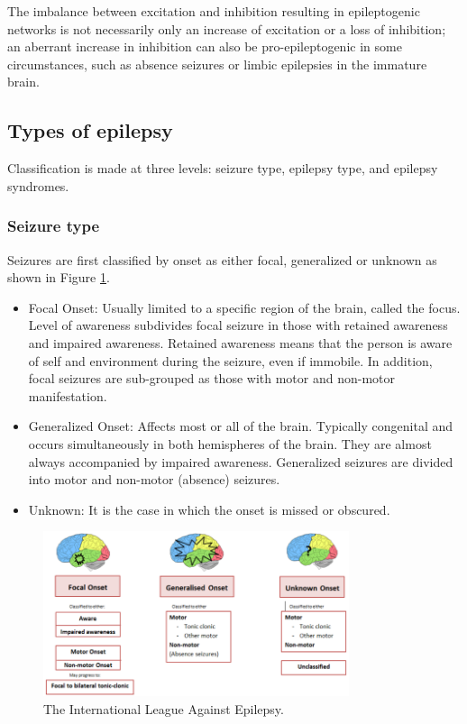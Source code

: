   The imbalance between excitation and inhibition resulting in epileptogenic networks is not necessarily only an increase of excitation or a loss of inhibition; an aberrant increase in inhibition can also be pro-epileptogenic in some circumstances, such as absence seizures \cite{pinault2005cellular} or limbic epilepsies in the immature brain. \cite{galanopoulou2008gabaa}

  \subsection*{Types of epilepsy}
  Classification is made at three levels: seizure type, epilepsy type, and epilepsy syndromes. \cite{classification}
    \subsubsection*{Seizure type}
    Seizures are first classified by onset as either focal, generalized or unknown as shown in Figure \ref{fig:Classification of epileptic seizures}.
    \begin{itemize}
      \item Focal Onset: Usually limited to a specific region of the brain, called the focus. Level of awareness subdivides focal seizure in those with retained awareness and impaired awareness. Retained awareness means that the person is aware of self and environment during the seizure, even if immobile. In addition, focal seizures are sub-grouped as those with motor and non-motor manifestation.
      \item Generalized Onset: Affects most or all of the brain. Typically congenital and occurs simultaneously in both hemispheres of the brain. They are almost always accompanied by impaired awareness. Generalized seizures are divided into motor and non-motor (absence) seizures.
      \item Unknown: It is the case in which the onset is missed or obscured. 
    \end{itemize}

    \begin{figure}[h]
      \centering
      \includegraphics[width=0.8\textwidth]{images/seizureTypes.png}
      \caption{The International League Against Epilepsy.\cite{Scheffer2017}}
      \label{fig:Classification of epileptic seizures}
    \end{figure}
  

